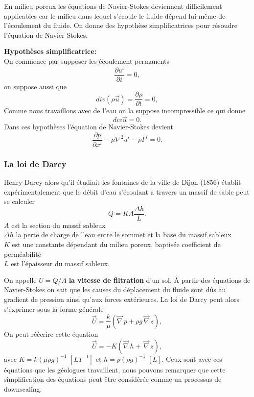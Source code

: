 \documentclass[a4paper,10pt]{article}
\begin{document}
En milieu poreux les équations de Navier-Stokes deviennent difficilement applicables car le milieu dans lequel s'écoule le fluide dépend lui-même de l'écoulement du fluide. On donne des hypothèse simplificatrices pour résoudre l'équation de Navier-Stokes. 

\noindent \textbf{Hypothèses simplificatrice:}\\
On commence par supposer les écoulement permanents
\[\frac{\partial u^i}{\partial t}=0,\]
on suppose aussi que
\[div(\rho \overrightarrow{u})=\frac{\partial \rho}{\partial t}=0,\]
Comme nous travaillons avec de l'eau on la suppose incompressible ce qui donne
\[div \overrightarrow{u}=0.\]
Dans ces hypothèses l'équation de Navier-Stokes devient
\begin{equation}
	\frac{\partial p}{\partial x^i}-\mu \nabla^2u^i-\rho F^i=0. 
\end{equation}

\subsubsection{La loi de Darcy}
Henry Darcy alors qu'il étudiait les fontaines de la ville de Dijon (1856) établit expérimentalement que le débit d'eau s'écoulant à travers un massif de sable peut se calculer
\begin{equation}
	Q=KA\frac{\Delta h}{L}.
\end{equation}
$A$ est la section du massif sableux\\
$\Delta h$ la perte de charge de l'eau entre le sommet et la base du massif sableux\\
$K$ est une constante dépendant du milieu poreux, baptisée coefficient de perméabilité\\
$L$ est l'épaisseur du massif sableux.

On appelle $U=Q/A$ \textbf{la vitesse de filtration} d'un sol. À partir des équations de Navier-Stokes on sait que les causes du déplacement du fluide sont dûs au gradient de pression ainsi qu'aux forces extérieures. La loi de Darcy peut alors s'exprimer sous la forme générale
\begin{equation}
	\overrightarrow{U}=\frac{k}{\mu }(\overrightarrow{\nabla}\, p+\rho g \,\overrightarrow{\nabla}\, z),
\end{equation} 
On peut réécrire cette équation
\[\overrightarrow{U}=-K(\overrightarrow{\nabla}\, h + \,\overrightarrow{\nabla}\, z),\]
avec $K=k(\mu \rho g)^{-1}$ $[LT^{-1}]$ et $h=p(\rho g)^{-1}$ $[L]$. 
Ceux sont avec ces équations que les géologues travaillent, nous pouvons remarquer que cette simplification des équations peut être considérée comme un processus de downscaling.
\end{document}
